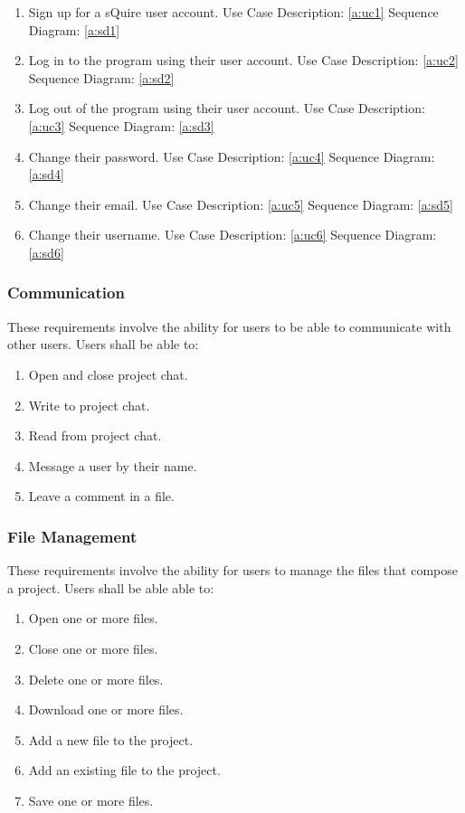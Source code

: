 \documentclass[twoside,letterpaper]{article}
\begin{document}
{\begin{enumerate}
	\item Sign up for a sQuire user account.
		\subitem Use Case Description: \ref{a:uc1}
		\subitem Sequence Diagram:  \ref{a:sd1}
	\item Log in to the program using their user account.
		\subitem Use Case Description: \ref{a:uc2}
		\subitem Sequence Diagram: \ref{a:sd2}
	\item Log out of the program using their user account.
		\subitem Use Case Description: \ref{a:uc3}
		\subitem Sequence Diagram: \ref{a:sd3}
	\item Change their password.
		\subitem Use Case Description: \ref{a:uc4}
		\subitem Sequence Diagram: \ref{a:sd4}
	\item Change their email.
		\subitem Use Case Description: \ref{a:uc5}
		\subitem Sequence Diagram: \ref{a:sd5}
	\item Change their username.
		\subitem Use Case Description: \ref{a:uc6}
		\subitem Sequence Diagram: \ref{a:sd6}
\end{enumerate}

\subsubsection{Communication}

These requirements involve the ability for users to be able to communicate with other users. Users shall be able to:

\begin{enumerate}
	\item Open and close project chat.
	\item Write to project chat.
	\item Read from project chat.
	\item Message a user by their name.
	\item Leave a comment in a file.
\end{enumerate}

\subsubsection{File Management}

These requirements involve the ability for users to manage the files that compose a project. Users shall be able able to:

\begin{enumerate}
	\item Open one or more files.
	\item Close one or more files.
	\item Delete one or more files.
	\item Download one or more files.
	\item Add a new file to the project.
	\item Add an existing file to the project.
	\item Save one or more files.
\end{enumerate}

}
\end{document}
